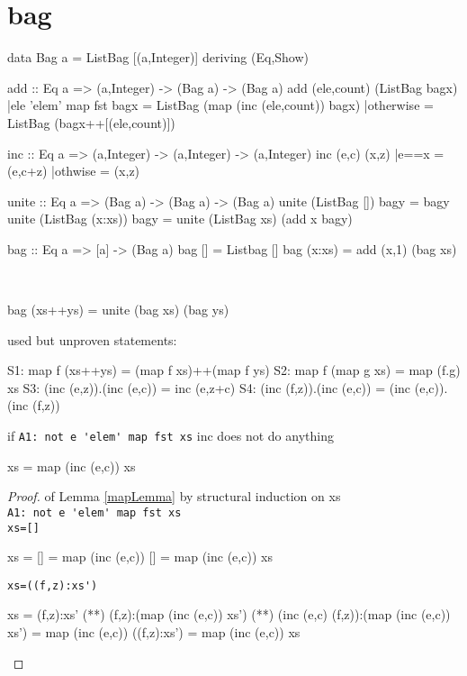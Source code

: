 \section{bag}
\begin{code}
data Bag a = ListBag [(a,Integer)] deriving (Eq,Show)
\end{code}
\begin{code}
add :: Eq a => (a,Integer) -> (Bag a) -> (Bag a)
add (ele,count) (ListBag bagx)
    |ele 'elem' map fst bagx = ListBag (map (inc (ele,count)) bagx) 
    |otherwise               = ListBag (bagx++[(ele,count)])
\end{code}
\begin{code}
inc :: Eq a => (a,Integer) -> (a,Integer) -> (a,Integer)
inc (e,c) (x,z)
    |e==x    = (e,c+z)
    |othwise = (x,z)
\end{code}
\begin{code}
unite :: Eq a => (Bag a) -> (Bag a) -> (Bag a)
unite (ListBag [])     bagy = bagy
unite (ListBag (x:xs)) bagy = unite (ListBag xs) (add x bagy)
\end{code}
\begin{code}
bag :: Eq a => [a] -> (Bag a)
bag []     = Listbag []
bag (x:xs) = add (x,1) (bag xs)
\end{code}
\begin{claim}\label{bagClaim}\ 
\begin{code}
bag (xs++ys) = unite (bag xs) (bag ys) 
\end{code}
\end{claim}
used but unproven statements:
\begin{code}
S1: map f (xs++ys) = (map f xs)++(map f ys)
S2: map f (map g xs) = map (f.g) xs
S3: (inc (e,z)).(inc (e,c)) = inc (e,z+c)
S4: (inc (f,z)).(inc (e,c)) = (inc (e,c)).(inc (f,z))
\end{code}
\begin{lemma}\label{mapLemma}if \verb|A1: not e 'elem' map fst xs| inc does not do anything
\begin{code}
xs = map (inc (e,c)) xs
\end{code}
\end{lemma}
\begin{proof} of Lemma \ref{mapLemma} by structural induction on xs\\
\verb|A1: not e 'elem' map fst xs|\\
\verb|xs=[]|
\begin{code}
xs = []
   = map (inc (e,c)) []
   = map (inc (e,c)) xs
\end{code}
\verb|xs=((f,z):xs')|
\begin{code}
xs = (f,z):xs'
   (**) (f,z):(map (inc (e,c)) xs')
   (**) (inc (e,c) (f,z)):(map (inc (e,c)) xs')
   = map (inc (e,c)) ((f,z):xs')
   = map (inc (e,c)) xs
\end{code}
\end{proof}
